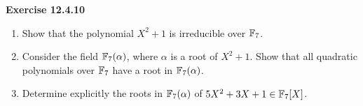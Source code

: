 \documentclass{article}
\begin{document}
\begin{homeworkProblem}
    \textbf{Exercise 12.4.10} 
    \begin{enumerate}
        \item Show that the polynomial $X^2 + 1$ is irreducible over $\mathbb{F}_7$.
        \item Consider the field $\mathbb{F}_7 (\alpha)$, where $\alpha$ is a root of $X^2 + 1$.
            Show that all quadratic polynomials over $\mathbb{F}_7$ have a root in $\mathbb{F}_7 (\alpha)$.
        \item Determine explicitly the roots in $\mathbb{F}_7(\alpha)$ of $5 X^2 + 3 X + 1 \in \mathbb{F}_7 [X]$.
    \end{enumerate}
    
    \solution \\

\end{homeworkProblem}
\end{document}
